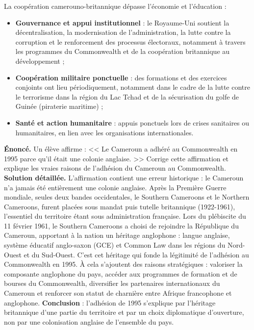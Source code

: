 \documentclass[11pt]{article}
\begin{document}
La coopération camerouno-britannique dépasse l'économie et l'éducation :
\begin{itemize}
\item \textbf{Gouvernance et appui institutionnel} : le Royaume-Uni soutient la décentralisation, la modernisation de l'administration, la lutte contre la corruption et le renforcement des processus électoraux, notamment à travers les programmes du Commonwealth et de la coopération britannique au développement ;
\item \textbf{Coopération militaire ponctuelle} : des formations et des exercices conjoints ont lieu périodiquement, notamment dans le cadre de la lutte contre le terrorisme dans la région du Lac Tchad et de la sécurisation du golfe de Guinée (piraterie maritime) ;
\item \textbf{Santé et action humanitaire} : appuis ponctuels lors de crises sanitaires ou humanitaires, en lien avec les organisations internationales.
\end{itemize}

\begin{exoresolu}
\textbf{Énoncé.} Un élève affirme : << Le Cameroun a adhéré au Commonwealth en 1995 parce qu'il était une colonie anglaise. >> Corrige cette affirmation et explique les vraies raisons de l'adhésion du Cameroun au Commonwealth.
\tcblower
\textbf{Solution détaillée.} L'affirmation contient une erreur historique : le Cameroun n'a jamais été entièrement une colonie anglaise. Après la Première Guerre mondiale, seules deux bandes occidentales, le Southern Cameroons et le Northern Cameroons, furent placées sous mandat puis tutelle britannique (1922-1961), l'essentiel du territoire étant sous administration française. Lors du plébiscite du 11 février 1961, le Southern Cameroons a choisi de rejoindre la République du Cameroun, apportant à la nation un héritage anglophone : langue anglaise, système éducatif anglo-saxon (GCE) et Common Law dans les régions du Nord-Ouest et du Sud-Ouest. C'est cet héritage qui fonde la légitimité de l'adhésion au Commonwealth en 1995. À cela s'ajoutent des raisons stratégiques : valoriser la composante anglophone du pays, accéder aux programmes de formation et de bourses du Commonwealth, diversifier les partenaires internationaux du Cameroun et renforcer son statut de charnière entre Afrique francophone et anglophone. \textbf{Conclusion} : l'adhésion de 1995 s'explique par l'héritage britannique d'une partie du territoire et par un choix diplomatique d'ouverture, non par une colonisation anglaise de l'ensemble du pays.
\end{exoresolu}
\end{document}
